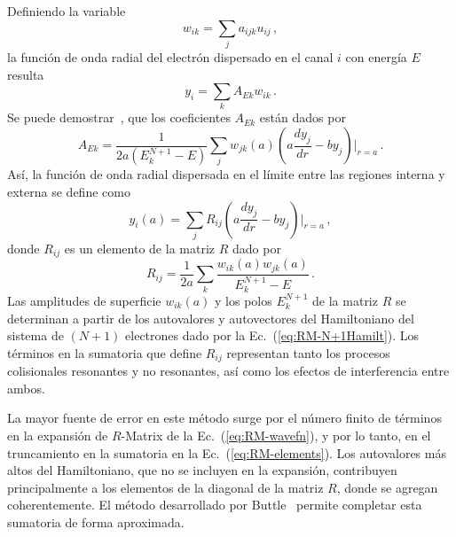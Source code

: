 Definiendo la variable
\begin{equation}
w_{ik}=\sum_j a_{ijk}u_{ij}\,,
\end{equation}
la función de onda radial del electrón dispersado en el canal $i$ con 
energía $E$ resulta
\begin{equation}
y_i=\sum_kA_{Ek}w_{ik}\,.
\end{equation}
Se puede demostrar~\cite{Burke:75}, que los coeficientes $A_{Ek}$ 
están dados por
\begin{equation}
A_{Ek}=\frac{1}{2a\left(E_k^{N+1}-E\right)}\sum_jw_{jk}(a)
\left(a\frac{dy_j}{dr}-by_j\right)\bigg|_{r=a}\,.
\end{equation}
Así, la función de onda radial dispersada en el límite entre las 
regiones interna y externa se define como
\begin{equation}
y_i(a)=\sum_j R_{ij}\left(a\frac{dy_j}{dr}-by_j\right)\bigg|_{r=a}\,,
\end{equation}
donde $R_{ij}$ es un elemento de la matriz $R$ dado por
\begin{equation}
R_{ij} = \frac{1}{2a}\sum_k\frac{w_{ik}(a)w_{jk}(a)}{E_k^{N+1}-E}\,.
\label{eq:RM-elements}
\end{equation}
Las amplitudes de superficie $w_{ik}(a)$ y los polos $E_k^{N+1}$ de la 
matriz $R$ se determinan a partir de los autovalores y autovectores del 
Hamiltoniano del sistema de $(N+1)$ electrones dado por la 
Ec.~(\ref{eq:RM-N+1Hamilt}). Los términos en la sumatoria que define 
$R_{ij}$ representan tanto los procesos colisionales resonantes y no 
resonantes, así como los efectos de interferencia entre ambos.

La mayor fuente de error en este método surge por el número finito de 
términos en la expansión de $R$-Matrix de la Ec.~(\ref{eq:RM-wavefn}), y 
por lo tanto, en el truncamiento en la sumatoria en la 
Ec.~(\ref{eq:RM-elements}). Los autovalores más altos del Hamiltoniano,
que no se incluyen en la expansión, contribuyen principalmente a los 
elementos de la diagonal de la matriz $R$, donde se agregan 
coherentemente. El método desarrollado por Buttle~\cite{Buttle:67} 
permite completar esta sumatoria de forma aproximada. 

